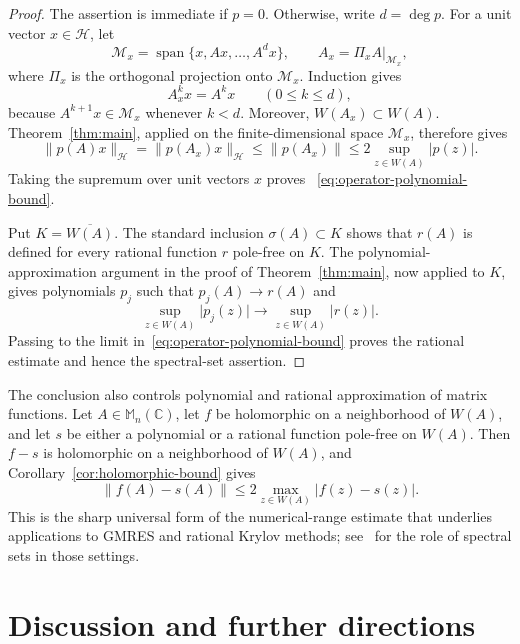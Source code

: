 \documentclass[preprints,article,submit,oneauthor]{Definitions/mdpi}
\theoremstyle{mdpi}
\theoremstyle{definition}
\newcommand{\C}{\mathbb C}
\newcommand{\Mn}{\mathbb M_n(\C)}
\begin{document}
\begin{proof}
The assertion is immediate if $p=0$.  Otherwise, write $d=\deg p$.
For a unit vector $x\in\mathcal H$, let
\[
  \mathcal M_x=\operatorname{span}\{x,Ax,\ldots,A^d x\},
  \qquad
  A_x=\left.\Pi_x A\right|_{\mathcal M_x},
\]
where $\Pi_x$ is the orthogonal projection onto
$\mathcal M_x$.  Induction gives
\begin{equation}
  A_x^k x=A^k x \qquad(0\leq k\leq d),
  \label{eq:Krylov-agreement}
\end{equation}
because $A^{k+1}x\in\mathcal M_x$ whenever $k<d$.  Moreover,
$W(A_x)\subset W(A)$.  Theorem~\ref{thm:main}, applied on the
finite-dimensional space $\mathcal M_x$, therefore gives
\[
  \lVert p(A)x\rVert_{\mathcal H}
  =\lVert p(A_x)x\rVert_{\mathcal H}
  \leq\lVert p(A_x)\rVert
  \leq2\sup_{z\in W(A)}\lvert p(z)\rvert.
\]
Taking the supremum over unit vectors $x$ proves~%
\eqref{eq:operator-polynomial-bound}.

Put $K=\overline{W(A)}$.  The standard inclusion
$\sigma(A)\subset K$ shows that $r(A)$ is defined for every rational
function $r$ pole-free on $K$.  The polynomial-approximation
argument in the proof of Theorem~\ref{thm:main}, now applied to $K$,
gives polynomials $p_j$ such that $p_j(A)\to r(A)$ and
\[
  \sup_{z\in W(A)}\lvert p_j(z)\rvert
  \longrightarrow
  \sup_{z\in W(A)}\lvert r(z)\rvert.
\]
Passing to the limit in~\eqref{eq:operator-polynomial-bound} proves the
rational estimate and hence the spectral-set assertion.
\end{proof}

The conclusion also controls polynomial and rational approximation of
matrix functions.  Let $A\in\Mn$, let $f$ be holomorphic on a
neighborhood of $W(A)$, and let $s$ be either a polynomial or a
rational function pole-free on $W(A)$.  Then $f-s$ is holomorphic on
a neighborhood of $W(A)$, and Corollary~\ref{cor:holomorphic-bound}
gives
\begin{equation}
  \lVert f(A)-s(A)\rVert
  \leq2\max_{z\in W(A)}\lvert f(z)-s(z)\rvert.
  \label{eq:matrix-function-error}
\end{equation}
This is the sharp universal form of the numerical-range estimate that
underlies applications to GMRES and rational Krylov methods; see~%
\cite{ChoiGreenbaum2015,CrouzeixGreenbaum2019,ChenGreenbaumTrogdon2025}
for the role of spectral sets in those settings.

\section{Discussion and further directions}
\label{sec:outlook}
\end{document}
